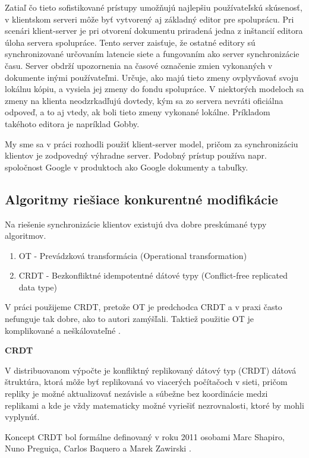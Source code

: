 Zatiaľ čo tieto sofistikované prístupy umožňujú najlepšiu používateľskú skúsenosť,
v klientskom serveri môže byť vytvorený aj základný editor pre spoluprácu. Pri scenári
klient-server je pri otvorení dokumentu priradená jedna z inštancií editora úloha servera
spolupráce. Tento server zaisťuje, že ostatné editory sú synchronizované určovaním
latencie siete a fungovaním ako server synchronizácie času. Server obdrží upozornenia
na časové označenie zmien vykonaných v dokumente inými používateľmi. 
Určuje, ako majú tieto zmeny ovplyvňovať svoju lokálnu kópiu, a vysiela jej zmeny do
fondu spolupráce. V niektorých modeloch sa zmeny na klienta neodzrkadľujú dovtedy,
kým sa zo servera nevráti oficiálna odpoveď, a to aj vtedy, ak boli tieto zmeny vykonané lokálne.
Príkladom takéhoto editora je napríklad Gobby.

My sme sa v práci rozhodli použiť klient-server model, pričom za synchronizáciu klientov
je zodpovedný výhradne server. Podobný prístup používa napr. spoločnost Google v produktoch
ako Google dokumenty a tabuľky.

\subsection{Algoritmy riešiace konkurentné modifikácie}
Na riešenie synchronizácie klientov existujú dva dobre preskúmané typy algoritmov.
\begin{enumerate}
  \item OT - Prevádzková transformácia (Operational transformation)
  \item CRDT - Bezkonfliktné idempotentné dátové typy (Conflict-free replicated data type)
\end{enumerate}
V práci použijeme CRDT, pretože OT je predchodca CRDT a v praxi často nefunguje tak dobre,
ako to autori zamýšľali. Taktiež použitie OT je komplikované a neškálovateľné \cite{ot_nonscalable}.

\begin{flushleft}\textbf {CRDT \cite{crdt_wiki}}\end{flushleft}

V distribuovanom výpočte je konfliktný replikovaný dátový typ (CRDT) dátová štruktúra,
ktorá môže byť replikovaná vo viacerých počítačoch v sieti, pričom repliky je možné
aktualizovať nezávisle a súbežne bez koordinácie medzi replikami a kde je vždy
matematicky možné vyriešiť nezrovnalosti, ktoré by mohli vyplynúť.

Koncept CRDT bol formálne definovaný v roku 2011 osobami
Marc Shapiro, Nuno Preguiça, Carlos Baquero a Marek Zawirski \cite{crdt_definition}.

